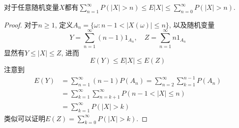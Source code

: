 \documentclass[cn, 12pt, math=mtpro2, bibstyle=apa, blue, twocol]{elegantbook}
\begin{document}
\begin{lemma}\label{lem:lem2.3}
对于任意随机变量$X$都有$\sum_{n=1}^{\infty}P(|X|>n)\leq E|X|\leq \sum_{n=0}^{\infty}P(|X|>n)$.
\end{lemma}
\begin{proof}
  对于$n\ge1$, 定义$A_n=\{\omega: n-1<|X(\omega)|\leq n\}$, 以及随机变量
  $$Y=\sum_{n=1}^{\infty}(n-1)1_{A_n},\quad Z=\sum_{n=1}^{\infty}n1_{A_n}$$
  显然有$Y\leq |X|\leq Z$, 进而
  $$E(Y)\leq E|X|\leq E(Z)$$
  注意到
  \begin{align*}
  E(Y)&=\sum_{n=1}^{\infty}(n-1)P(A_n)=\sum_{n=2}^{\infty}\sum_{k=1}^{n-1}P(A_n) \\
  &=\sum_{k=1}^{\infty}\sum_{n=k+1}^{\infty}P(n-1<|X|\leq n) \\
  &=\sum_{k=1}^{\infty}P(|X|>k)
  \end{align*}
  类似可以证明$E(Z)=\sum_{k=0}^{\infty}P(|X|>k)$.
\end{proof}
\end{document}
